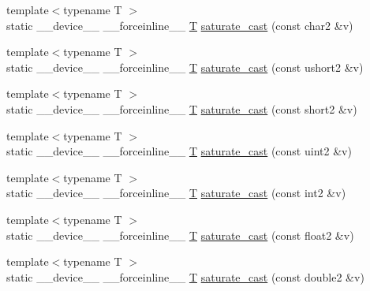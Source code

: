 \begin{DoxyCompactItemize}
\item 
{\footnotesize template$<$typename T $>$ }\\static \-\_\-\-\_\-device\-\_\-\-\_\- \-\_\-\-\_\-forceinline\-\_\-\-\_\- \hyperlink{calib3d_8hpp_a3efb9551a871ddd0463079a808916717}{T} \hyperlink{namespacecv_1_1gpu_1_1device_ab277a66d11547a59779ef44774652961}{saturate\-\_\-cast} (const char2 \&v)
\item 
{\footnotesize template$<$typename T $>$ }\\static \-\_\-\-\_\-device\-\_\-\-\_\- \-\_\-\-\_\-forceinline\-\_\-\-\_\- \hyperlink{calib3d_8hpp_a3efb9551a871ddd0463079a808916717}{T} \hyperlink{namespacecv_1_1gpu_1_1device_a010e1405717a9741aa0937788a32f1a9}{saturate\-\_\-cast} (const ushort2 \&v)
\item 
{\footnotesize template$<$typename T $>$ }\\static \-\_\-\-\_\-device\-\_\-\-\_\- \-\_\-\-\_\-forceinline\-\_\-\-\_\- \hyperlink{calib3d_8hpp_a3efb9551a871ddd0463079a808916717}{T} \hyperlink{namespacecv_1_1gpu_1_1device_ace1abe7f1c5ee1d8320800f78fac1e72}{saturate\-\_\-cast} (const short2 \&v)
\item 
{\footnotesize template$<$typename T $>$ }\\static \-\_\-\-\_\-device\-\_\-\-\_\- \-\_\-\-\_\-forceinline\-\_\-\-\_\- \hyperlink{calib3d_8hpp_a3efb9551a871ddd0463079a808916717}{T} \hyperlink{namespacecv_1_1gpu_1_1device_a19c15cdbda1ebf12d7405ecb6806d80a}{saturate\-\_\-cast} (const uint2 \&v)
\item 
{\footnotesize template$<$typename T $>$ }\\static \-\_\-\-\_\-device\-\_\-\-\_\- \-\_\-\-\_\-forceinline\-\_\-\-\_\- \hyperlink{calib3d_8hpp_a3efb9551a871ddd0463079a808916717}{T} \hyperlink{namespacecv_1_1gpu_1_1device_ad4bd02687261bf26045ca1695a5531ce}{saturate\-\_\-cast} (const int2 \&v)
\item 
{\footnotesize template$<$typename T $>$ }\\static \-\_\-\-\_\-device\-\_\-\-\_\- \-\_\-\-\_\-forceinline\-\_\-\-\_\- \hyperlink{calib3d_8hpp_a3efb9551a871ddd0463079a808916717}{T} \hyperlink{namespacecv_1_1gpu_1_1device_add505ecd489fef4ca905e56f1f70aeee}{saturate\-\_\-cast} (const float2 \&v)
\item 
{\footnotesize template$<$typename T $>$ }\\static \-\_\-\-\_\-device\-\_\-\-\_\- \-\_\-\-\_\-forceinline\-\_\-\-\_\- \hyperlink{calib3d_8hpp_a3efb9551a871ddd0463079a808916717}{T} \hyperlink{namespacecv_1_1gpu_1_1device_a6d138c0fad0bdc776228735535492b23}{saturate\-\_\-cast} (const double2 \&v)

\end{DoxyCompactItemize}
